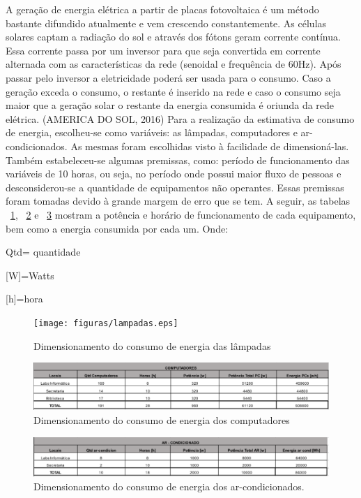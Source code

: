 A geração de energia elétrica a partir de placas fotovoltaica é um método bastante difundido atualmente e vem crescendo constantemente. As células solares captam a radiação do sol e através dos fótons geram corrente contínua. Essa corrente passa por um inversor para que seja convertida em corrente alternada com as características da rede (senoidal e frequência de 60Hz). Após passar pelo inversor a eletricidade poderá ser usada para o consumo. Caso a geração exceda o consumo, o restante é inserido na rede e caso o consumo seja maior que a geração solar o restante da energia consumida é oriunda da rede elétrica. (AMERICA DO SOL, 2016)
Para a realização da estimativa de consumo de energia, escolheu-se como variáveis: as lâmpadas, computadores e ar-condicionados. As mesmas foram escolhidas visto à facilidade de dimensioná-las. Também estabeleceu-se algumas premissas, como: período de funcionamento das variáveis de 10 horas, ou seja, no período onde possui maior fluxo de pessoas e desconsiderou-se a quantidade de equipamentos não operantes. Essas premissas foram tomadas devido à grande margem de erro que se tem. A seguir, as tabelas ~\ref{fig:lampadas}, ~\ref{fig:computadores} e ~\ref{fig:ar_condicionados} mostram a potência e horário de funcionamento de cada equipamento, bem como a energia consumida por cada um.
Onde:

\centerline{Qtd= quantidade} 
\centerline{[W]=Watts} 
\centerline{[h]=hora} 

\begin{figure}[!h]
  \centering
  \texttt{[image: figuras/lampadas.eps]}
  \caption{Dimensionamento do consumo de energia das lâmpadas}
  \label{fig:lampadas}
\end{figure}

\begin{figure}[!h]
  \centering
  \includegraphics[keepaspectratio=true,scale=0.3]{figuras/computadores.eps}
  \caption{Dimensionamento do consumo de energia dos computadores}
  \label{fig:computadores}
\end{figure}

\begin{figure}[!h]
  \centering
  \includegraphics[keepaspectratio=true,scale=0.3]{figuras/ar_condicionados.eps}
  \caption{Dimensionamento do consumo de energia dos ar-condicionados.}
  \label{fig:ar_condicionados}
\end{figure}

